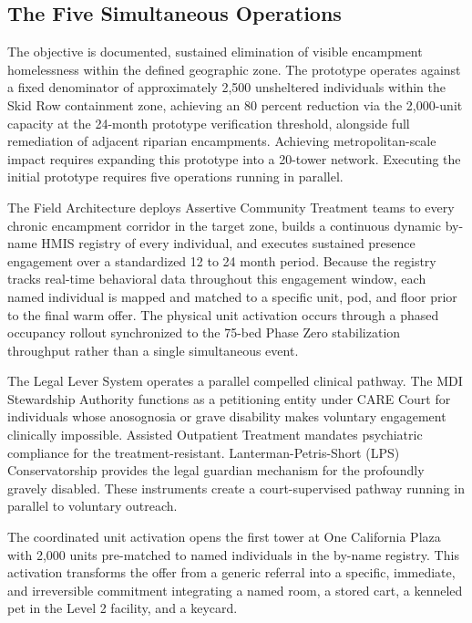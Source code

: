 \documentclass[12pt, letterpaper]{article}
\begin{document}
\subsection{The Five Simultaneous Operations}

The objective is documented, sustained elimination of visible encampment homelessness within the defined geographic zone. The prototype operates against a fixed denominator of approximately 2,500 unsheltered individuals within the Skid Row containment zone, achieving an 80 percent reduction via the 2,000-unit capacity at the 24-month prototype verification threshold, alongside full remediation of adjacent riparian encampments. Achieving metropolitan-scale impact requires expanding this prototype into a 20-tower network. Executing the initial prototype requires five operations running in parallel.

The Field Architecture deploys Assertive Community Treatment teams to every chronic encampment corridor in the target zone, builds a continuous dynamic by-name HMIS registry of every individual, and executes sustained presence engagement over a standardized 12 to 24 month period. Because the registry tracks real-time behavioral data throughout this engagement window, each named individual is mapped and matched to a specific unit, pod, and floor prior to the final warm offer. The physical unit activation occurs through a phased occupancy rollout synchronized to the 75-bed Phase Zero stabilization throughput rather than a single simultaneous event.

The Legal Lever System operates a parallel compelled clinical pathway. The MDI Stewardship Authority functions as a petitioning entity under CARE Court for individuals whose anosognosia or grave disability makes voluntary engagement clinically impossible. Assisted Outpatient Treatment mandates psychiatric compliance for the treatment-resistant. Lanterman-Petris-Short (LPS) Conservatorship provides the legal guardian mechanism for the profoundly gravely disabled. These instruments create a court-supervised pathway running in parallel to voluntary outreach.

The coordinated unit activation opens the first tower at One California Plaza with 2,000 units pre-matched to named individuals in the by-name registry. This activation transforms the offer from a generic referral into a specific, immediate, and irreversible commitment integrating a named room, a stored cart, a kenneled pet in the Level 2 facility, and a keycard.
\end{document}
